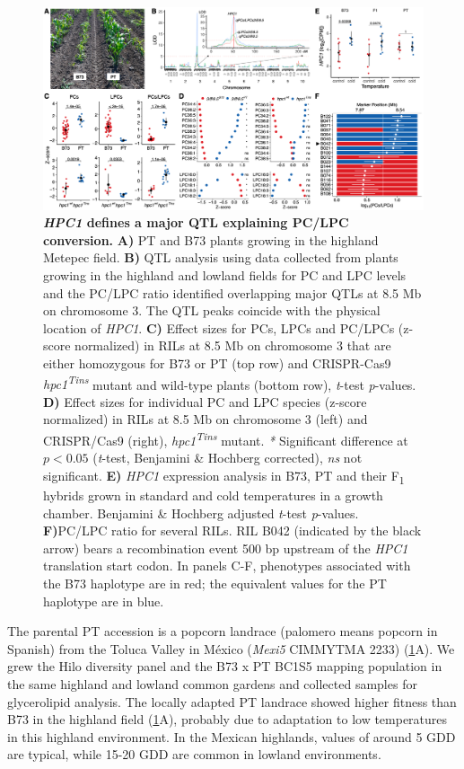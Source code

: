 \documentclass[9pt,twocolumn,twoside,lineno]{biorxiv}
\newcommand{\hpc}{\textit{HPC1}\xspace}
\begin{document}
\begin{figure}[ht]
\begin{center}
\includegraphics[width=0.8\paperwidth]{Figures/Fig_3.png}
\caption{\textbf{\hpc defines a major QTL explaining PC/LPC conversion.} 
\textbf{A)} PT and B73 plants growing in the highland Metepec field. 
\textbf{B)} QTL analysis using data collected from plants growing in the highland and lowland fields for PC and LPC levels and the PC/LPC ratio identified overlapping major QTLs at 8.5 Mb on chromosome 3. 
The QTL peaks coincide with the physical location of \hpc. 
\textbf{C)} Effect sizes for PCs, LPCs and PC/LPCs (z-score normalized) in RILs at 8.5 Mb on chromosome 3 that are either homozygous for B73 or PT (top row) and CRISPR-Cas9 \textit{hpc1\textsuperscript{Tins}} mutant and wild-type plants (bottom row), \textit{t}-test \textit{p}-values. 
\textbf{D)} Effect sizes for individual PC and LPC species (z-score normalized) in RILs at 8.5 Mb on chromosome 3 (left) and CRISPR/Cas9 (right),
\textit{hpc1\textsuperscript{Tins}} mutant. \textit{*} Significant difference at $p < 0.05$ (\textit{t}-test, Benjamini \& Hochberg corrected), \textit{ns} not significant.
\textbf{E)} \hpc expression analysis in B73, PT and their F\textsubscript{1} hybrids grown in standard and cold temperatures in a growth chamber. Benjamini \& Hochberg adjusted \textit{t}-test \textit{p}-values.
\textbf{F)}PC/LPC ratio for several RILs. RIL B042 (indicated by the black arrow) bears a recombination event 500 bp upstream of the \hpc translation start codon.
In panels C-F, phenotypes associated with the B73 haplotype are in red; the equivalent values for the PT haplotype are in blue.}
\label{Fig3}
\end{center}
\end{figure}
The parental PT accession is a popcorn landrace (palomero means popcorn in Spanish) from the Toluca Valley in M\'exico (\textit{Mexi5} CIMMYTMA 2233) (\cref{Fig3}A). 
We grew the Hilo diversity panel and the B73 x PT BC1S5 mapping population in the same highland and lowland common gardens and collected samples for glycerolipid analysis.
The locally adapted PT landrace showed higher fitness than B73 in the highland field (\cref{Fig3}A), probably due to adaptation to low temperatures in this highland environment.  
In the Mexican highlands, values of around 5 GDD are typical, while 15-20 GDD are common in lowland environments. 
\end{document}
